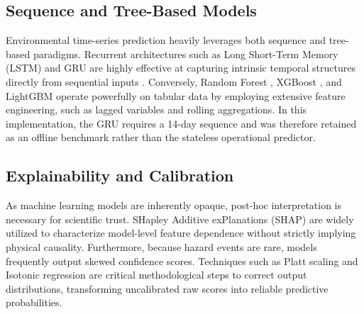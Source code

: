 \subsection{Sequence and Tree-Based Models}
Environmental time-series prediction heavily leverages both sequence and tree-based paradigms. Recurrent architectures such as Long Short-Term Memory (LSTM) and GRU \cite{Cho2014} are highly effective at capturing intrinsic temporal structures directly from sequential inputs \cite{Kratzert2018}. Conversely, Random Forest \cite{Breiman2001}, XGBoost \cite{Chen2016}, and LightGBM \cite{Ke2017} operate powerfully on tabular data by employing extensive feature engineering, such as lagged variables and rolling aggregations. In this implementation, the GRU requires a 14-day sequence and was therefore retained as an offline benchmark rather than the stateless operational predictor.

\subsection{Explainability and Calibration}
As machine learning models are inherently opaque, post-hoc interpretation is necessary for scientific trust. SHapley Additive exPlanations (SHAP) \cite{Lundberg2017} are widely utilized to characterize model-level feature dependence without strictly implying physical causality. Furthermore, because hazard events are rare, models frequently output skewed confidence scores. Techniques such as Platt scaling \cite{Platt1999} and Isotonic regression \cite{Zadrozny2002} are critical methodological steps to correct output distributions, transforming uncalibrated raw scores into reliable predictive probabilities.
